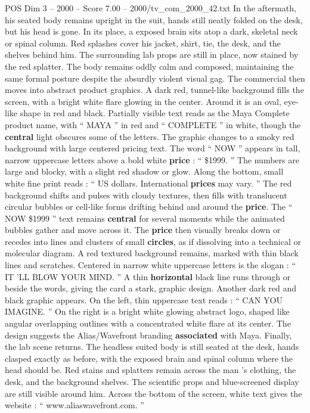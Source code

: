 \begin{textsample}{POS Dim 3 – 2000 – Score 7.00 – 2000/tv\_com\_2000\_42.txt}
In the aftermath, his seated body remains upright in the suit, hands still neatly folded on the desk, but his head is gone.
In its place, a exposed brain sits atop a dark, skeletal neck or spinal column.
Red splashes cover his jacket, shirt, tie, the desk, and the shelves behind him.
The surrounding lab props are still in place, now stained by the red splatter.
The body remains oddly calm and composed, maintaining the same formal posture despite the absurdly violent visual gag.
The commercial then moves into abstract product graphics.
A dark red, tunnel-like background fills the screen, with a bright white flare glowing in the center.
Around it is an oval, eye-like shape in red and black.
Partially visible text reads as the Maya Complete product name, with “ MAYA ” in red and “ COMPLETE ” in white, though the \textbf{central} light obscures some of the letters.
The graphic changes to a smoky red background with large centered pricing text.
The word “ NOW ” appears in tall, narrow uppercase letters above a bold white \textbf{price} : “ \$1999. ” The numbers are large and blocky, with a slight red shadow or glow.
Along the bottom, small white fine print reads : “ US dollars.
International \textbf{prices} may vary. ” The red background shifts and pulses with cloudy textures, then fills with translucent circular bubbles or cell-like forms drifting behind and around the \textbf{price}.
The “ NOW \$1999 ” text remains \textbf{central} for several moments while the animated bubbles gather and move across it.
The \textbf{price} then visually breaks down or recedes into lines and clusters of small \textbf{circles}, as if dissolving into a technical or molecular diagram.
A red textured background remains, marked with thin black lines and scratches.
Centered in narrow white uppercase letters is the slogan : “ IT ’LL BLOW YOUR MIND. ” A thin \textbf{horizontal} black line runs through or beside the words, giving the card a stark, graphic design.
Another dark red and black graphic appears.
On the left, thin uppercase text reads : “ CAN YOU IMAGINE. ” On the right is a bright white glowing abstract logo, shaped like angular overlapping outlines with a concentrated white flare at its center.
The design suggests the Alias/Wavefront branding \textbf{associated} with Maya.
Finally, the lab scene returns.
The headless suited body is still seated at the desk, hands clasped exactly as before, with the exposed brain and spinal column where the head should be.
Red stains and splatters remain across the man ’s clothing, the desk, and the background shelves.
The scientific props and blue-screened display are still visible around him.
Across the bottom of the screen, white text gives the website : “ www.aliaswavefront.com. ”

\end{textsample}
